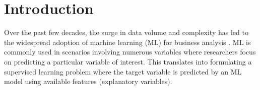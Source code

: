 \documentclass[12pt]{article}  %
\begin{document}
\section{Introduction}

Over the past few decades, the surge in data volume and complexity has led to the widespread adoption of machine learning (ML) for business analysis \citep{kleinberg2015prediction,mullainathan17applied}. ML is commonly used in scenarios involving numerous variables where researchers focus on predicting a particular variable of interest. This translates into formulating a supervised learning problem where the target variable is predicted by an ML model using available features (explanatory variables).
\end{document}
